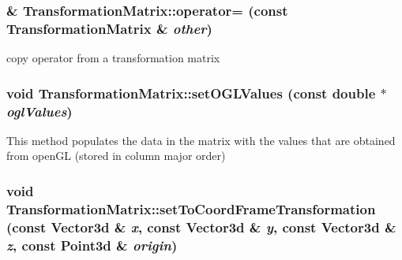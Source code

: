 \hypertarget{classCartWheel_1_1Math_1_1TransformationMatrix_a3b85f165673e14e45fa241de4a883ed4}{
\subsubsection[{operator=}]{ \& TransformationMatrix::operator= (const {\bf TransformationMatrix} \& {\em other})}}
\label{classCartWheel_1_1Math_1_1TransformationMatrix_a3b85f165673e14e45fa241de4a883ed4}
copy operator from a transformation matrix \hypertarget{classCartWheel_1_1Math_1_1TransformationMatrix_a004de1c6f16e401e4155f7a33e48c5a5}{
\subsubsection[{setOGLValues}]{\setlength{\rightskip}{0pt plus 5cm}void TransformationMatrix::setOGLValues (const double $\ast$ {\em oglValues})}}
\label{classCartWheel_1_1Math_1_1TransformationMatrix_a004de1c6f16e401e4155f7a33e48c5a5}
This method populates the data in the matrix with the values that are obtained from openGL (stored in column major order) \hypertarget{classCartWheel_1_1Math_1_1TransformationMatrix_a4782fe58d012a498373bc7005fe04b11}{
\subsubsection[{setToCoordFrameTransformation}]{\setlength{\rightskip}{0pt plus 5cm}void TransformationMatrix::setToCoordFrameTransformation (const {\bf Vector3d} \& {\em x}, \/  const {\bf Vector3d} \& {\em y}, \/  const {\bf Vector3d} \& {\em z}, \/  const {\bf Point3d} \& {\em origin})}}
\label{classCartWheel_1_1Math_1_1TransformationMatrix_a4782fe58d012a498373bc7005fe04b11}
